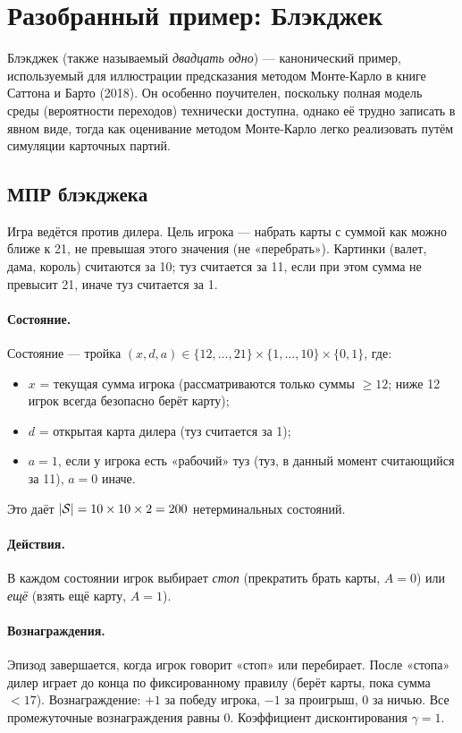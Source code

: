 \section{Разобранный пример: Блэкджек}
\label{sec:mc-blackjack}

Блэкджек (также называемый \emph{двадцать одно}) --- канонический пример, используемый для иллюстрации предсказания методом Монте-Карло в книге Саттона и Барто (2018).  Он особенно поучителен, поскольку полная модель среды (вероятности переходов) технически доступна, однако её трудно записать в явном виде, тогда как оценивание методом Монте-Карло легко реализовать путём симуляции карточных партий.

\subsection*{МПР блэкджека}

Игра ведётся против дилера.  Цель игрока --- набрать карты с суммой как можно ближе к 21, не превышая этого значения (не «перебрать»).  Картинки (валет, дама, король) считаются за 10; туз считается за 11, если при этом сумма не превысит 21, иначе туз считается за 1.

\paragraph{Состояние.}  Состояние --- тройка $(x, d, a) \in \{12,\dots,21\} \times \{1,\dots,10\} \times \{0,1\}$, где:
\begin{itemize}[leftmargin=*]
  \item $x$ = текущая сумма игрока (рассматриваются только суммы $\ge 12$; ниже 12 игрок всегда безопасно берёт карту);
  \item $d$ = открытая карта дилера (туз считается за 1);
  \item $a = 1$, если у игрока есть «рабочий» туз (туз, в данный момент считающийся за 11), $a = 0$ иначе.
\end{itemize}
Это даёт $|\mathcal{S}| = 10 \times 10 \times 2 = 200$ нетерминальных состояний.

\paragraph{Действия.}  В каждом состоянии игрок выбирает \emph{стоп} (прекратить брать карты, $A=0$) или \emph{ещё} (взять ещё карту, $A=1$).

\paragraph{Вознаграждения.}  Эпизод завершается, когда игрок говорит «стоп» или перебирает.  После «стопа» дилер играет до конца по фиксированному правилу (берёт карты, пока сумма $< 17$).  Вознаграждение: $+1$ за победу игрока, $-1$ за проигрыш, $0$ за ничью.  Все промежуточные вознаграждения равны $0$.  Коэффициент дисконтирования $\gamma = 1$.

